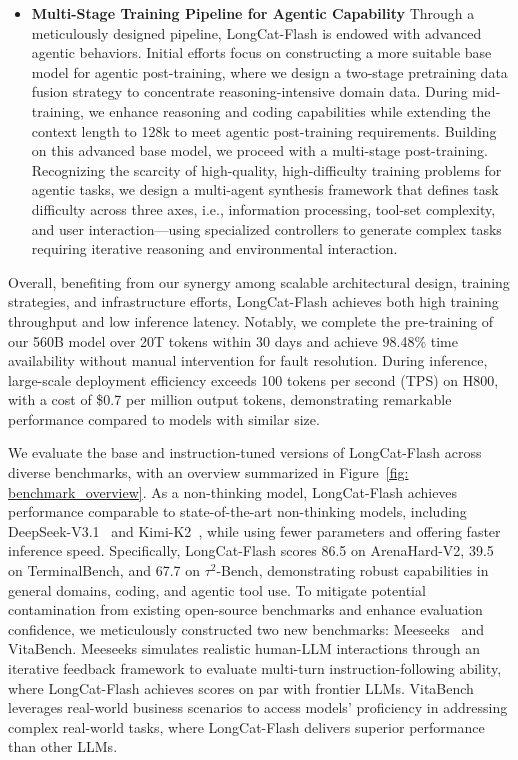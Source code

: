 \documentclass{article}
\newcommand{\longcat}{LongCat-Flash\xspace}
\begin{document}
\begin{itemize}
\item \textbf{Multi-Stage Training Pipeline for Agentic Capability} 
Through a meticulously designed pipeline, \longcat is endowed with advanced agentic behaviors. 
Initial efforts focus on constructing a more suitable base model for agentic post-training, where we design a two-stage pretraining data fusion strategy to concentrate reasoning-intensive domain data. During mid-training, we enhance reasoning and coding capabilities while extending the context length to 128k to meet agentic post-training requirements.
Building on this advanced base model, we proceed with a multi-stage post-training. Recognizing the scarcity of high-quality, high-difficulty training problems for agentic tasks, we design a multi-agent synthesis framework that defines task difficulty across three axes, i.e., information processing, tool-set complexity, and user interaction—using specialized controllers to generate complex tasks requiring iterative reasoning and environmental interaction.

\end{itemize}

Overall, benefiting from our synergy among scalable architectural design, training strategies, and infrastructure efforts, \longcat achieves both high training throughput and low inference latency.
Notably, we complete the pre-training of our 560B model over 20T tokens within 30 days and achieve 98.48\% time availability without manual intervention for fault resolution.
During inference, large-scale deployment efficiency exceeds 100 tokens per second (TPS) on H800, with a cost of \$0.7 per million output tokens, demonstrating remarkable performance compared to models with similar size.

We evaluate the base and instruction-tuned versions of \longcat across diverse benchmarks, with an overview summarized in Figure~\ref{fig: benchmark_overview}. As a non-thinking model, \longcat achieves performance comparable to state-of-the-art non-thinking models, including DeepSeek-V3.1~\citep{deepseekai2025deepseekv3technicalreport} and Kimi-K2~\citep{team2025kimi}, while using fewer parameters and offering faster inference speed. Specifically, \longcat scores 86.5 on ArenaHard-V2, 39.5 on TerminalBench, and 67.7 on $\tau^2$-Bench, demonstrating robust capabilities in general domains, coding, and agentic tool use. To mitigate potential contamination from existing open-source benchmarks and enhance evaluation confidence, we meticulously constructed two new benchmarks: Meeseeks~\citep{meeseeks} and VitaBench. Meeseeks simulates realistic human-LLM interactions through an iterative feedback framework to evaluate multi-turn instruction-following ability, where \longcat achieves scores on par with frontier LLMs. VitaBench leverages real-world business scenarios to access models’ proficiency in addressing complex real-world tasks, where \longcat delivers superior performance than other LLMs.
\end{document}

